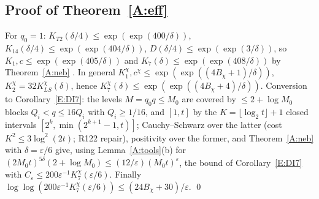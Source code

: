 \documentclass[10pt,reqno]{amsart}
\theoremstyle{definition}
\numberwithin{equation}{section}
\begin{document}
\subsection{Proof of Theorem~\ref{A:eff}}
For $q_0=1$: $K_{T2}(\delta/4)\le\exp(\exp(400/\delta))$,
$K_{14}(\delta/4)\le\exp(\exp(404/\delta))$, $D(\delta/4)\le\exp(\exp(3/\delta))$, so
$K_1,c\le\exp(\exp(405/\delta))$ and $K_7(\delta)\le\exp(\exp(408/\delta))$ by
Theorem~\ref{A:neb} \cite[Theorem~7.1]{TTL3}. In general
$K_1^\chi,c^\chi\le\exp(\exp((4B_\chi+1)/\delta))$, $K_2^\chi=32K_{LS}^\chi(\delta)$, hence
$K_7^\chi(\delta)\le\exp(\exp((4B_\chi+4)/\delta))$. Conversion to
Corollary~\ref{E:DI7}: the levels $M=q_0q\le M_0$ are covered by
$\le2+\log M_0$ blocks $Q_i<q\le16Q_i$ with $Q_i\ge1/16$, and $[1,t]$ by the
$K=\lfloor\log_2t\rfloor+1$ closed intervals
$[2^k,\min(2^{k+1}-1,t)]$; Cauchy--Schwarz over the latter (cost $K^2\le3\log^2(2t)$; R122 repair), positivity over
the former, and Theorem~\ref{A:neb} with $\delta=\varepsilon/6$ give, using
Lemma~\ref{A:tools}(b) for $(2M_0t)^{5\delta}(2+\log M_0)\le(12/\varepsilon)(M_0t)^\varepsilon$,
the bound of Corollary~\ref{E:DI7} with $C_\varepsilon\le200\varepsilon^{-1}K_7^\chi(\varepsilon/6)$.
Finally $\log\log(200\varepsilon^{-1}K_7^\chi(\varepsilon/6))\le(24B_\chi+30)/\varepsilon$. \qed
\end{document}
